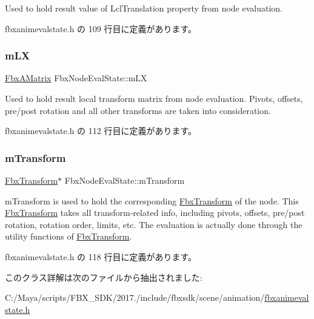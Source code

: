 Used to hold result value of Lcl\+Translation property from node evaluation. 



 fbxanimevalstate.\+h の 109 行目に定義があります。

\mbox{\label{class_fbx_node_eval_state_a54312754ca26de28be9272c304e7ba4f}} 
\subsubsection{\texorpdfstring{m\+LX}{mLX}}
{\footnotesize\ttfamily \hyperlink{class_fbx_a_matrix}{Fbx\+A\+Matrix} Fbx\+Node\+Eval\+State\+::m\+LX}



Used to hold result local transform matrix from node evaluation. Pivots, offsets, pre/post rotation and all other transforms are taken into consideration. 



 fbxanimevalstate.\+h の 112 行目に定義があります。

\mbox{\label{class_fbx_node_eval_state_a49ac9e098c85b1642bb7f78d90c756ac}} 
\subsubsection{\texorpdfstring{m\+Transform}{mTransform}}
{\footnotesize\ttfamily \hyperlink{class_fbx_transform}{Fbx\+Transform}$\ast$ Fbx\+Node\+Eval\+State\+::m\+Transform}

m\+Transform is used to hold the corresponding \hyperlink{class_fbx_transform}{Fbx\+Transform} of the node. This \hyperlink{class_fbx_transform}{Fbx\+Transform} takes all transform-\/related info, including pivots, offsets, pre/post rotation, rotation order, limits, etc. The evaluation is actually done through the utility functions of \hyperlink{class_fbx_transform}{Fbx\+Transform}. 

 fbxanimevalstate.\+h の 118 行目に定義があります。



このクラス詳解は次のファイルから抽出されました\+:\begin{DoxyCompactItemize}
\item 
C\+:/\+Maya/scripts/\+F\+B\+X\+\_\+\+S\+D\+K/2017./include/fbxsdk/scene/animation/\hyperlink{fbxanimevalstate_8h}{fbxanimevalstate.\+h}\end{DoxyCompactItemize}
